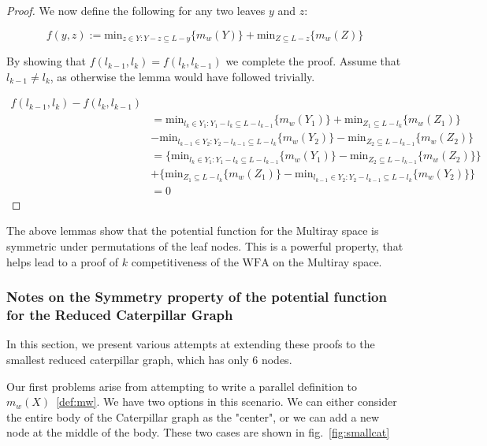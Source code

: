 \begin{proof}
    We now define the following for any two leaves $y$ and $z$: 

    \begin{equation*}
        f(y, z) := \mathrm{min}_{z \in Y : Y - z \subseteq L-y} \{ m_w(Y)\} + \mathrm{min}_{Z \subseteq L-z} \{ m_w(Z)\}
    \end{equation*}

    By showing that $f(l_{k-1}, l_k) = f(l_k, l_{k-1})$ we complete the proof.
    Assume that $l_{k-1} \neq l_k$, as otherwise the lemma would have followed trivially. 

    \begin{equation*}
        \begin{split}
        f(l_{k-1}, l_k) - f(l_k, l_{k-1})\\
        &= \mathrm{min}_{l_k \in Y_1 : Y_1 - l_k \subseteq L - l_{k-1}} \{ m_w(Y_1)\} + \mathrm{min}_{Z_1 \subseteq L - l_k} \{ m_w(Z_1)\} \\
        &- \mathrm{min}_{l_{k-1} \in Y_2 : Y_2 - l_{k-1} \subseteq L - l_k} \{ m_w(Y_2)\} - \mathrm{min}_{Z_2 \subseteq L - l_{k-1}} \{ m_w(Z_2)\} \\
        &= \{ \mathrm{min}_{l_k \in Y_1 : Y_1 - l_k \subseteq L - l_{k-1}} \{ m_w(Y_1)\} - \mathrm{min}_{Z_2 \subseteq L - l_{k-1}} \{ m_w(Z_2)\}\}\\
        &+ \{\mathrm{min}_{Z_1 \subseteq L - l_k} \{ m_w(Z_1)\} - \mathrm{min}_{l_{k-1} \in Y_2 : Y_2 - l_{k-1} \subseteq L - l_k} \{ m_w(Y_2)\}\} \\ 
        &= 0
        \end{split}
    \end{equation*}
\end{proof}

The above lemmas show that the potential function for the Multiray space is symmetric under permutations of the leaf nodes. This is a powerful property, that helps lead to a proof of $k$ competitiveness of the $\mathrm{WFA}$ on the Multiray space.

\subsubsection*{Notes on the Symmetry property of the potential function for the Reduced Caterpillar Graph}

In this section, we present various attempts at extending these proofs to the smallest reduced caterpillar graph, which has only 6 nodes.

Our first problems arise from attempting to write a parallel definition to $m_w(X)$~\ref{def:mw}. We have two options in this scenario. We can either consider the entire body of the Caterpillar graph as the "center", or we can add a new node at the middle of the body. These two cases are shown in fig.~\ref{fig:smallcat}

